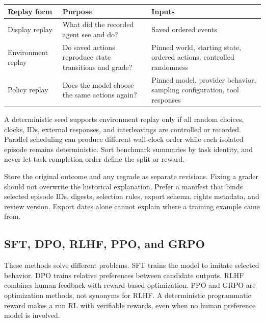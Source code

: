 \documentclass[
  11pt,
  letterpaper,
]{article}
\newcounter{none} %
\begin{document}
{\def\LTcaptype{none} %
\begin{longtable}[]{@{}
  >{\raggedright\arraybackslash}p{}
  >{\raggedright\arraybackslash}p{}
  >{\raggedright\arraybackslash}p{}@{}}
\toprule\noalign{}
\begin{minipage}[b]{\linewidth}\raggedright
Replay form
\end{minipage} & \begin{minipage}[b]{\linewidth}\raggedright
Purpose
\end{minipage} & \begin{minipage}[b]{\linewidth}\raggedright
Inputs
\end{minipage} \\
\midrule\noalign{}
\endhead
\bottomrule\noalign{}
\endlastfoot
Display replay & What did the recorded agent see and do? & Saved ordered
events \\
Environment replay & Do saved actions reproduce state transitions and
grade? & Pinned world, starting state, ordered actions, controlled
randomness \\
Policy replay & Does the model choose the same actions again? & Pinned
model, provider behavior, sampling configuration, tool responses \\
\end{longtable}
}

A deterministic seed supports environment replay only if all random
choices, clocks, IDs, external responses, and interleavings are
controlled or recorded. Parallel scheduling can produce different
wall-clock order while each isolated episode remains deterministic. Sort
benchmark summaries by task identity, and never let task completion
order define the split or reward.

Store the original outcome and any regrade as separate revisions. Fixing
a grader should not overwrite the historical explanation. Prefer a
manifest that binds selected episode IDs, digests, selection rules,
export schema, rights metadata, and review version. Export dates alone
cannot explain where a training example came from.

\subsection{SFT, DPO, RLHF, PPO, and
GRPO}\label{sft-dpo-rlhf-ppo-and-grpo}

These methods solve different problems. SFT trains the model to imitate
selected behavior. DPO trains relative preferences between candidate
outputs. RLHF combines human feedback with reward-based optimization.
PPO and GRPO are optimization methods, not synonyms for RLHF. A
deterministic programmatic reward makes a run RL with verifiable
rewards, even when no human preference model is involved.
\end{document}
